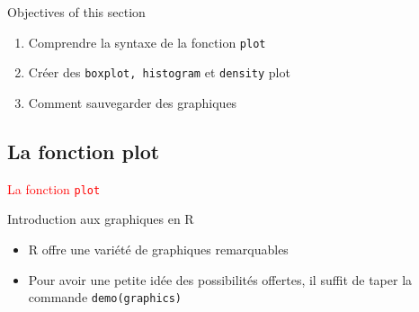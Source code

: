 \documentclass[11pt]{beamer}\usepackage[]{graphicx}\usepackage[]{color}
\newcommand{\code}[1]{\texttt{#1}}
\begin{document}
\begin{frame}[plain]
\hspace*{-1.0cm}\parbox[t]{\textwidth}{
\begin{block}{Objectives of this section}
\begin{enumerate}
\item Comprendre la syntaxe de la fonction \code{plot}
\item Créer des \code{boxplot, histogram} et \code{density} plot
\item Comment sauvegarder des graphiques
\end{enumerate}
\end{block}
}
\end{frame}



\subsection{La fonction plot}

\begin{frame}
 \begin{center}
  \Huge{\textcolor{red}{La fonction \code{plot}}}
 \end{center}
\end{frame}



\begin{frame}[fragile]{Introduction aux graphiques en R}
\begin{itemize}
  \setlength\itemsep{2em}
  \item R offre une variété de graphiques remarquables 
  \item Pour avoir une petite idée des possibilités offertes, il suffit de taper la commande \code{demo(graphics)} 
\end{itemize}
\end{frame}
\end{document}
